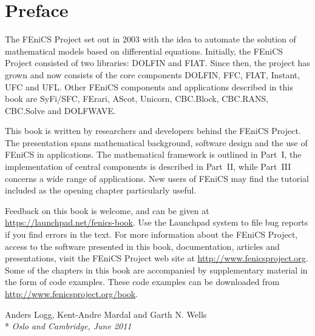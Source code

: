 \chapter*{Preface}

\thispagestyle{empty}

The FEniCS Project set out in 2003 with the idea to automate the
solution of mathematical models based on differential equations.
Initially, the FEniCS Project consisted of two libraries: DOLFIN and
FIAT. Since then, the project has grown and now consists of the core
components DOLFIN, FFC, FIAT, Instant, UFC and UFL. Other FEniCS
components and applications described in this book are SyFi/SFC,
FErari, AScot, Unicorn, CBC.Block, CBC.RANS, CBC.Solve and DOLFWAVE.


This book is written by researchers and developers behind the FEniCS
Project. The presentation spans mathematical background, software
design and the use of FEniCS in applications. The mathematical
framework is outlined in Part~I, the implementation of central
components is described in Part~II, while Part~III concerns a wide
range of applications. New users of FEniCS may find the tutorial
included as the opening chapter particularly useful.

Feedback on this book is welcome, and can be given at
\url{https://launchpad.net/fenics-book}. Use the Launchpad system to
file bug reports if you find errors in the text. For more information
about the FEniCS Project, access to the software presented in this
book, documentation, articles and presentations, visit the FEniCS
Project web site at \url{http://www.fenicsproject.org}. Some of the
chapters in this book are accompanied by supplementary material in the
form of code examples. These code examples can be downloaded from
\url{http://www.fenicsproject.org/book}.


\vspace{1em}

\noindent
Anders Logg, Kent-Andre Mardal and Garth N. Wells \\*
\emph{Oslo and Cambridge, June 2011}
